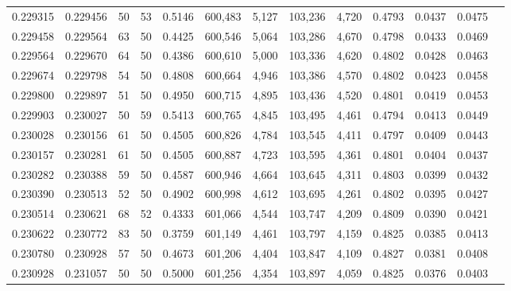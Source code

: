 \begin{tabular}{rrrrrrrrrrrrr}
0.229315 & 0.229456 &    50 &  53 &                                     0.5146 & 600,483 &   5,127 & 103,236 &   4,720 & 0.4793 & 0.0437 & 0.0475 \\
0.229458 & 0.229564 &    63 &  50 &                                     0.4425 & 600,546 &   5,064 & 103,286 &   4,670 & 0.4798 & 0.0433 & 0.0469 \\
0.229564 & 0.229670 &    64 &  50 &                                     0.4386 & 600,610 &   5,000 & 103,336 &   4,620 & 0.4802 & 0.0428 & 0.0463 \\
0.229674 & 0.229798 &    54 &  50 &                                     0.4808 & 600,664 &   4,946 & 103,386 &   4,570 & 0.4802 & 0.0423 & 0.0458 \\
0.229800 & 0.229897 &    51 &  50 &                                     0.4950 & 600,715 &   4,895 & 103,436 &   4,520 & 0.4801 & 0.0419 & 0.0453 \\
0.229903 & 0.230027 &    50 &  59 &                                     0.5413 & 600,765 &   4,845 & 103,495 &   4,461 & 0.4794 & 0.0413 & 0.0449 \\
0.230028 & 0.230156 &    61 &  50 &                                     0.4505 & 600,826 &   4,784 & 103,545 &   4,411 & 0.4797 & 0.0409 & 0.0443 \\
0.230157 & 0.230281 &    61 &  50 &                                     0.4505 & 600,887 &   4,723 & 103,595 &   4,361 & 0.4801 & 0.0404 & 0.0437 \\
0.230282 & 0.230388 &    59 &  50 &                                     0.4587 & 600,946 &   4,664 & 103,645 &   4,311 & 0.4803 & 0.0399 & 0.0432 \\
0.230390 & 0.230513 &    52 &  50 &                                     0.4902 & 600,998 &   4,612 & 103,695 &   4,261 & 0.4802 & 0.0395 & 0.0427 \\
0.230514 & 0.230621 &    68 &  52 &                                     0.4333 & 601,066 &   4,544 & 103,747 &   4,209 & 0.4809 & 0.0390 & 0.0421 \\
0.230622 & 0.230772 &    83 &  50 &                                     0.3759 & 601,149 &   4,461 & 103,797 &   4,159 & 0.4825 & 0.0385 & 0.0413 \\
0.230780 & 0.230928 &    57 &  50 &                                     0.4673 & 601,206 &   4,404 & 103,847 &   4,109 & 0.4827 & 0.0381 & 0.0408 \\
0.230928 & 0.231057 &    50 &  50 &                                     0.5000 & 601,256 &   4,354 & 103,897 &   4,059 & 0.4825 & 0.0376 & 0.0403 \\

\end{tabular}
